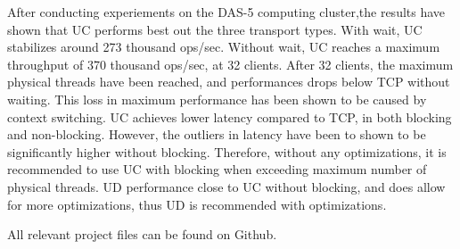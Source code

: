 \begin{abstracts}
    After conducting experiements on the DAS-5 computing cluster,the results have shown that UC performs best out the three transport types.
    With wait, UC stabilizes around 273 thousand ops/sec.
    Without wait, UC reaches a maximum throughput of 370 thousand ops/sec, at 32 clients.
    After 32 clients, the maximum physical threads have been reached, and performances drops below TCP without waiting.
    This loss in maximum performance has been shown to be caused by context switching.
    UC achieves lower latency compared to TCP, in both blocking and non-blocking.
    However, the outliers in latency have been to shown to be significantly higher without blocking.
    Therefore, without any optimizations, it is recommended to use UC with blocking when exceeding maximum number of physical threads.
    UD performance close to UC without blocking, and does allow for more optimizations, thus UD is recommended with optimizations.

    All relevant project files can be found on Github\cite{github}.

\end{abstracts}


